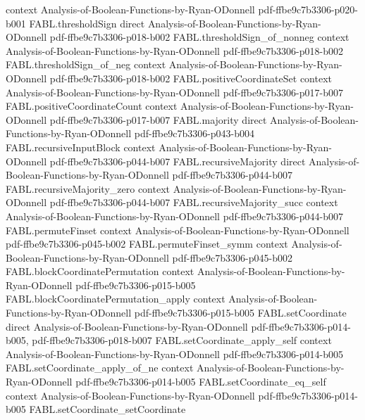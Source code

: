 \begin{theorem}
  {context}
  {Analysis-of-Boolean-Functions-by-Ryan-ODonnell}
  {pdf-ffbe9c7b3306-p020-b001}
\proofstep
  {FABL.thresholdSign}
  {direct}
  {Analysis-of-Boolean-Functions-by-Ryan-ODonnell}
  {pdf-ffbe9c7b3306-p018-b002}
\proofstep
  {FABL.thresholdSign_of_nonneg}
  {context}
  {Analysis-of-Boolean-Functions-by-Ryan-ODonnell}
  {pdf-ffbe9c7b3306-p018-b002}
\proofstep
  {FABL.thresholdSign_of_neg}
  {context}
  {Analysis-of-Boolean-Functions-by-Ryan-ODonnell}
  {pdf-ffbe9c7b3306-p018-b002}
\proofstep
  {FABL.positiveCoordinateSet}
  {context}
  {Analysis-of-Boolean-Functions-by-Ryan-ODonnell}
  {pdf-ffbe9c7b3306-p017-b007}
\proofstep
  {FABL.positiveCoordinateCount}
  {context}
  {Analysis-of-Boolean-Functions-by-Ryan-ODonnell}
  {pdf-ffbe9c7b3306-p017-b007}
\proofstep
  {FABL.majority}
  {direct}
  {Analysis-of-Boolean-Functions-by-Ryan-ODonnell}
  {pdf-ffbe9c7b3306-p043-b004}
\proofstep
  {FABL.recursiveInputBlock}
  {context}
  {Analysis-of-Boolean-Functions-by-Ryan-ODonnell}
  {pdf-ffbe9c7b3306-p044-b007}
\proofstep
  {FABL.recursiveMajority}
  {direct}
  {Analysis-of-Boolean-Functions-by-Ryan-ODonnell}
  {pdf-ffbe9c7b3306-p044-b007}
\proofstep
  {FABL.recursiveMajority_zero}
  {context}
  {Analysis-of-Boolean-Functions-by-Ryan-ODonnell}
  {pdf-ffbe9c7b3306-p044-b007}
\proofstep
  {FABL.recursiveMajority_succ}
  {context}
  {Analysis-of-Boolean-Functions-by-Ryan-ODonnell}
  {pdf-ffbe9c7b3306-p044-b007}
\proofstep
  {FABL.permuteFinset}
  {context}
  {Analysis-of-Boolean-Functions-by-Ryan-ODonnell}
  {pdf-ffbe9c7b3306-p045-b002}
\proofstep
  {FABL.permuteFinset_symm}
  {context}
  {Analysis-of-Boolean-Functions-by-Ryan-ODonnell}
  {pdf-ffbe9c7b3306-p045-b002}
\proofstep
  {FABL.blockCoordinatePermutation}
  {context}
  {Analysis-of-Boolean-Functions-by-Ryan-ODonnell}
  {pdf-ffbe9c7b3306-p015-b005}
\proofstep
  {FABL.blockCoordinatePermutation_apply}
  {context}
  {Analysis-of-Boolean-Functions-by-Ryan-ODonnell}
  {pdf-ffbe9c7b3306-p015-b005}
\proofstep
  {FABL.setCoordinate}
  {direct}
  {Analysis-of-Boolean-Functions-by-Ryan-ODonnell}
  {pdf-ffbe9c7b3306-p014-b005,
    pdf-ffbe9c7b3306-p018-b007}
\proofstep
  {FABL.setCoordinate_apply_self}
  {context}
  {Analysis-of-Boolean-Functions-by-Ryan-ODonnell}
  {pdf-ffbe9c7b3306-p014-b005}
\proofstep
  {FABL.setCoordinate_apply_of_ne}
  {context}
  {Analysis-of-Boolean-Functions-by-Ryan-ODonnell}
  {pdf-ffbe9c7b3306-p014-b005}
\proofstep
  {FABL.setCoordinate_eq_self}
  {context}
  {Analysis-of-Boolean-Functions-by-Ryan-ODonnell}
  {pdf-ffbe9c7b3306-p014-b005}
\proofstep
  {FABL.setCoordinate_setCoordinate}

\end{theorem}
